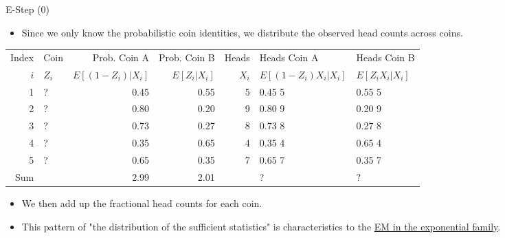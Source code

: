 \documentclass[dvipdfmx,bigger,aspectratio=169]{beamer}
\begin{document}
\begin{frame}[fragile,allowframebreaks,label=,t]{E-Step (0)}
\newpage
\begin{itemize}
\item Since we only know the probabilistic coin identities, we distribute the observed head counts across coins.
\end{itemize}
\footnotesize
\begin{center}
\begin{tabular}{r|l|rr|r|ll|}
Index & Coin & Prob. Coin A & Prob. Coin B & Heads & Heads Coin A & Heads Coin B\\
\(i\) & \(Z_{i}\) & \(E[(1-Z_{i})\vert X_{i}]\) & \(E[Z_{i}\vert X_{i}]\) & \(X_{i}\) & \(E[(1-Z_{i}) X_{i} \vert X_{i}]\) & \(E[Z_{i} X_{i} \vert X_{i}]\)\\
\hline
1 & ? & 0.45 & 0.55 & 5 & 0.45 \texttimes{} 5 & 0.55 \texttimes{} 5\\
2 & ? & 0.80 & 0.20 & 9 & 0.80 \texttimes{} 9 & 0.20 \texttimes{} 9\\
3 & ? & 0.73 & 0.27 & 8 & 0.73 \texttimes{} 8 & 0.27 \texttimes{} 8\\
4 & ? & 0.35 & 0.65 & 4 & 0.35 \texttimes{} 4 & 0.65 \texttimes{} 4\\
5 & ? & 0.65 & 0.35 & 7 & 0.65 \texttimes{} 7 & 0.35 \texttimes{} 7\\
\hline
Sum &  & 2.99 & 2.01 &  & ? & ?\\
\end{tabular}
\end{center}
\normalsize
\begin{itemize}
\item We then add up the fractional head counts for each coin.
\item This pattern of "the distribution of the sufficient statistics" is characteristics to the \href{http://www.stats.ox.ac.uk/\~flaxman/HT17\_lecture6.pdf}{EM in the exponential family}.
\end{itemize}


\end{frame}
\end{document}
